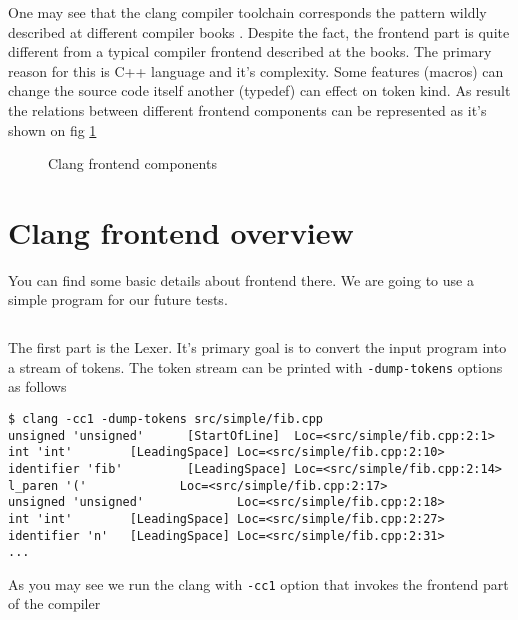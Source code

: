 One may see that the clang compiler toolchain corresponds the pattern
wildly described at different compiler books
\cite{book:engineering_a_compiler}. Despite the fact, the frontend
part is quite different from a typical compiler frontend described at
the books. The primary reason for this is C++ language and it's
complexity. Some features (macros) can change the source code itself
another (typedef) can effect on token kind. As result the relations
between different frontend components can be represented as it's shown
on fig \ref{fig:clang_frontend}
\begin{figure}
\begin{center}
\end{center}
  \caption{Clang frontend components}
  \label{fig:clang_frontend}
\end{figure}

\section{Clang frontend overview}
You can find some basic details about frontend there. We are going to
use a simple program for our future tests.
\inputminted{text}{./src/simple/fib.cpp}

The first part is the Lexer. It's primary goal is to convert the input
program into a stream of tokens. The token stream can be printed with
\texttt{-dump-tokens} options as follows
\begin{verbatim}
$ clang -cc1 -dump-tokens src/simple/fib.cpp
unsigned 'unsigned'      [StartOfLine]  Loc=<src/simple/fib.cpp:2:1>
int 'int'        [LeadingSpace] Loc=<src/simple/fib.cpp:2:10>
identifier 'fib'         [LeadingSpace] Loc=<src/simple/fib.cpp:2:14>
l_paren '('             Loc=<src/simple/fib.cpp:2:17>
unsigned 'unsigned'             Loc=<src/simple/fib.cpp:2:18>
int 'int'        [LeadingSpace] Loc=<src/simple/fib.cpp:2:27>
identifier 'n'   [LeadingSpace] Loc=<src/simple/fib.cpp:2:31>
...
\end{verbatim}
As you may see we run the clang with \texttt{-cc1} option
that invokes the frontend part of the compiler 

